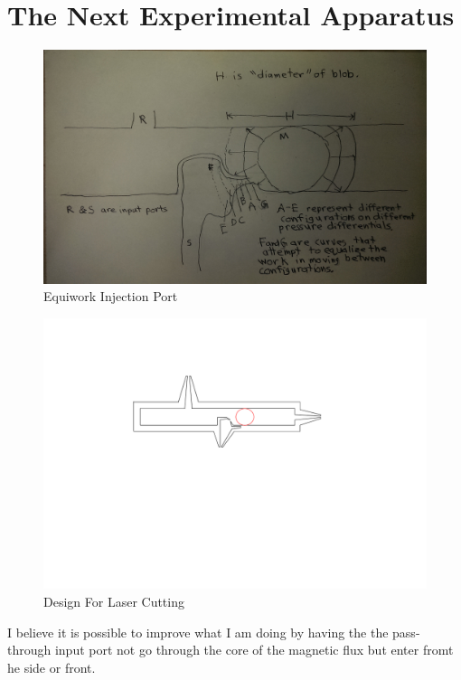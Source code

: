 \documentclass{article}
\begin{document}
\section{The Next Experimental Apparatus}


\begin{figure}
  \centering
     \includegraphics[width=1.0\textwidth]{CurvedInjection.jpg}
     \caption{Equiwork Injection Port}
  \label{fig:closeup}     
\end{figure}


\begin{figure}
  \centering
     \includegraphics[width=1.0\textwidth]{designforlasercutting.png}
     \caption{Design For Laser Cutting}
  \label{fig:closeup}     
\end{figure}


I believe it is possible to improve what I am doing by having the the pass-through input port not go through the core of the magnetic
flux but enter fromt he side or front.
\end{document}
